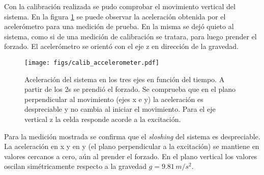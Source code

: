 \documentclass[../main.tex]{subfiles}
\begin{document}
Con la calibración realizada se pudo comprobar el movimiento vertical del sistema. En la figura \ref{fig:calib_acel} se puede observar la aceleración obtenida por el acelerómetro para una medición de prueba. En la misma se dejó quieto al sistema, como si de una medición de calibración se tratara, para luego prender el forzado. El acelerómetro se orientó con el eje z en dirección de la gravedad. 

\begin{figure}[H]
    \centering
    \texttt{[image: figs/calib\_accelerometer.pdf]}
    \caption{Aceleración del sistema en los tres ejes en función del tiempo. A partir de los 2s se prendió el forzado. Se comprueba que en el plano perpendicular al movimiento (ejes x e y) la aceleración es despreciable y no cambia al iniciar el movimiento. Para el eje vertical z la celda responde acorde a la excitación.}
    \label{fig:calib_acel}
\end{figure}

Para la medición mostrada se confirma que el \textit{sloshing} del sistema es despreciable. La aceleración en x y en y (el plano perpendicular a la excitación) se mantiene en valores cercanos a cero, aún al prender el forzado. En el plano vertical los valores oscilan simétricamente respecto a la gravedad $g=9.81 \, m/s^2$. 
\end{document}

